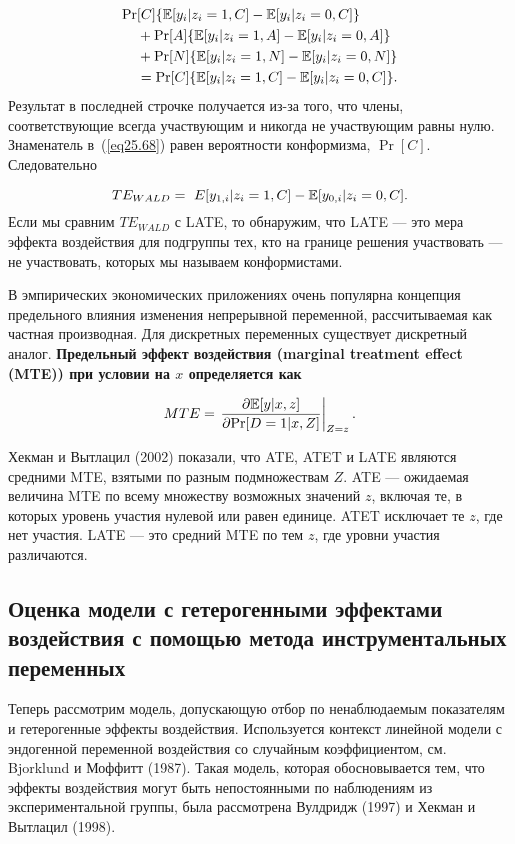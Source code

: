 \begin{align}
\mathrm{Pr} & [C]\{ \mathbb{E}[y_i | z_i = 1, C] - \mathbb{E}[y_i | z_i = 0, C] \}  \nonumber \\
& + \mathrm{Pr}[A]\{ \mathbb{E}[y_i | z_i = 1, A] - \mathbb{E}[y_i | z_i = 0, A] \} \nonumber \\
& + \mathrm{Pr}[N]\{ \mathbb{E}[y_i | z_i = 1, N] - \mathbb{E}[y_i | z_i = 0, N] \} \nonumber \\
& = \mathrm{Pr}[C]\{ \mathbb{E}[y_i | z_i = 1, C] - \mathbb{E}[y_i | z_i = 0, C] \}. \nonumber 
\end{align}
Результат в последней строчке получается из-за того, что члены, соответствующие всегда участвующим и никогда не участвующим равны нулю. Знаменатель в~(\ref{eq25.68}) равен вероятности конформизма, $\Pr[C]$. Следовательно

\begin{equation}
\label{eq25.69}
TE_{WALD} =\ E[y_{1,i} | z_i = 1, C] - \mathbb{E}[y_{0,i} | z_i = 0, C].
\end{equation}
Если мы сравним $TE_{WALD}$ с LATE, то обнаружим, что LATE --- это мера эффекта воздействия для подгруппы тех, кто на границе решения участвовать --- не участвовать, которых мы называем конформистами. 

В эмпирических экономических приложениях очень популярна концепция предельного влияния изменения непрерывной переменной, рассчитываемая как частная производная. Для дискретных переменных существует дискретный аналог. \bfseries Предельный эффект воздействия (marginal treatment effect (MTE)) \mdseries при условии на $x$ определяется как

\begin{equation}
\label{eq25.70}
MTE = \left. \frac{\partial \mathbb{E}[y|x,z]}{\partial \mathrm{Pr} [D = 1|x, Z]} \right|_{Z=z} .
\end{equation}

Хекман и Вытлацил (2002) показали, что ATE, ATET и LATE являются средними MTE, взятыми по разным подмножествам $Z$. ATE --- ожидаемая величина MTE по всему множеству возможных значений $z$, включая те, в которых уровень участия нулевой или равен единице. ATET исключает те $z$, где нет участия. LATE --- это средний MTE по тем $z$, где уровни участия различаются. 

\subsection{Оценка модели с гетерогенными эффектами воздействия с помощью метода инструментальных переменных}

Теперь рассмотрим модель, допускающую отбор по ненаблюдаемым показателям и гетерогенные эффекты воздействия. Используется контекст линейной модели с эндогенной переменной воздействия со случайным коэффициентом, см. Bjorklund и Моффитт (1987). Такая модель, которая обосновывается тем, что эффекты воздействия могут быть непостоянными по наблюдениям из экспериментальной группы, была рассмотрена Вулдридж (1997) и Хекман и Вытлацил (1998).

